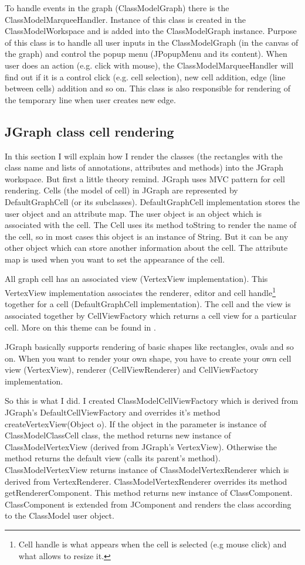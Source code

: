 To handle events in the graph (ClassModelGraph) there is the ClassModelMarqueeHandler. Instance of this class is created in the ClassModelWorkspace and is added into the ClassModelGraph instance. Purpose of this class is to handle all user inputs in the ClassModelGraph (in the canvas of the graph) and control the popup menu (JPopupMenu and its content). When user does an action (e.g. click with mouse), the ClassModelMarqueeHandler will find out if it is a control click (e.g. cell selection), new cell addition, edge (line between cells) addition and so on. This class is also responsible for rendering of the temporary line when user creates new edge.

\subsection{JGraph class cell rendering}

In this section I will explain how I render the classes (the rectangles with the class name and lists of annotations, attributes and methods) into the JGraph workspace. But first a little theory remind. JGraph uses MVC pattern for cell rendering. Cells (the model of cell) in JGraph are represented by DefaultGraphCell (or its subclasses). DefaultGraphCell implementation stores the user object and an attribute map. The user object is an object which is associated with the cell. The Cell uses its method toString to render the name of the cell, so in most cases this object is an instance of String. But it can be any other object which can store another information about the cell. The attribute map is used when you want to set the appearance of the cell.

All graph cell has an associated view (VertexView implementation). This VertexView implementation associates the renderer, editor and cell handle\footnote{Cell handle is what appears when the cell is selected (e.g mouse click) and what allows to resize it.} together for a cell (DefaultGraphCell implementation). The cell and the view is associated together by CellViewFactory which returns a cell view for a particular cell. More on this theme can be found in \cite{jgraphmanual}.

JGraph basically supports rendering of basic shapes like rectangles, ovals and so on. When you want to render your own shape, you have to create your own cell view (VertexView), renderer (CellViewRenderer) and CellViewFactory implementation.

So this is what I did. I created ClassModelCellViewFactory which is derived from JGraph's DefaultCellViewFactory and overrides it's method createVertexView(Object o). If the object in the parameter is instance of ClassModelClassCell class, the method returns new instance of ClassModelVertexView (derived from JGraph's VertexView). Otherwise the method returns the default view (calls its parent's method). ClassModelVertexView returns instance of ClassModelVertexRenderer which is derived from VertexRenderer. ClassModelVertexRenderer overrides its method getRendererComponent. This method returns new instance of ClassComponent. ClassComponent is extended from JComponent and renders the class according to the ClassModel user object.

